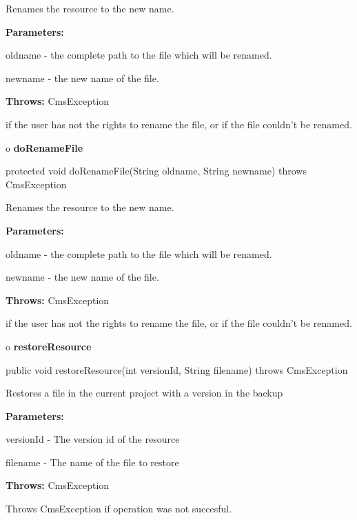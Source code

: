 \begin{description}
\htmlDD Renames the resource to the new name.

\begin{description}
\item {\bf Parameters:}

oldname - the complete path to the file which will be renamed.

newname - the new name of the file.
\item {\bf Throws:} CmsException

if the user has not the rights to rename the file, or if the file couldn't be
renamed.
\end{description}

\end{description}

o {\bf doRenameFile}

\begin{PRE}
 protected void doRenameFile(String oldname,
                             String newname) throws CmsException
\end{PRE}

\begin{description}
\htmlDD Renames the resource to the new name.

\begin{description}
\item {\bf Parameters:}

oldname - the complete path to the file which will be renamed.

newname - the new name of the file.
\item {\bf Throws:} CmsException

if the user has not the rights to rename the file, or if the file couldn't be
renamed.
\end{description}

\end{description}

o {\bf restoreResource}

\begin{PRE}
 public void restoreResource(int versionId,
                             String filename) throws CmsException
\end{PRE}

\begin{description}
\htmlDD Restores a file in the current project with a version in the backup

\begin{description}
\item {\bf Parameters:}

versionId - The version id of the resource

filename - The name of the file to restore
\item {\bf Throws:} CmsException

Throws CmsException if operation was not succesful.
\end{description}

\end{description}

